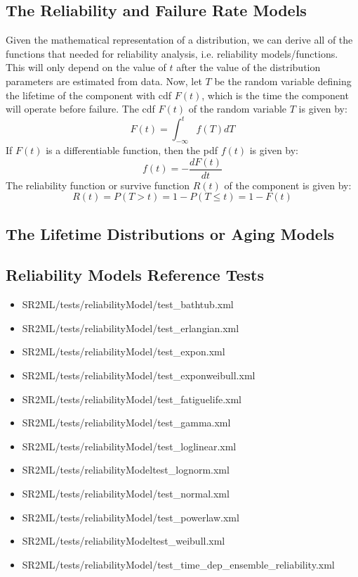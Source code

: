 \subsection{The Reliability and Failure Rate Models}
Given the mathematical representation of a distribution, we can derive all of the functions that needed
for reliability analysis, i.e. reliability models/functions. This will only depend on the value of $t$
after the value of the distribution parameters are estimated from data.
Now, let $T$ be the random variable defining the lifetime of the component with cdf $F(t)$, which is the
time the component will operate before failure. The cdf $F(t)$ of the random variable $T$ is given by:
\begin{equation}
  F(t) = \int_{-\infty}^{t} f(T)dT
\end{equation}
If $F(t)$ is a differentiable function, then the pdf $f(t)$ is given by:
\begin{equation}
  f(t) = - \frac{dF(t)}{dt}
\end{equation}
The reliability function or survive function $R(t)$ of the component is given by:
\begin{equation}
  R(t) = P(T>t) = 1 - P(T\leq t) = 1-F(t)
\end{equation}



\subsection{The Lifetime Distributions or Aging Models}


\subsection{Reliability Models Reference Tests}
\begin{itemize}
	\item SR2ML/tests/reliabilityModel/test\_bathtub.xml
  \item SR2ML/tests/reliabilityModel/test\_erlangian.xml
	\item SR2ML/tests/reliabilityModel/test\_expon.xml
  \item SR2ML/tests/reliabilityModel/test\_exponweibull.xml
	\item SR2ML/tests/reliabilityModel/test\_fatiguelife.xml
  \item SR2ML/tests/reliabilityModel/test\_gamma.xml
	\item SR2ML/tests/reliabilityModel/test\_loglinear.xml
  \item SR2ML/tests/reliabilityModeltest\_lognorm.xml
	\item SR2ML/tests/reliabilityModel/test\_normal.xml
  \item SR2ML/tests/reliabilityModel/test\_powerlaw.xml
	\item SR2ML/tests/reliabilityModeltest\_weibull.xml
	\item SR2ML/tests/reliabilityModel/test\_time\_dep\_ensemble\_reliability.xml
\end{itemize}
